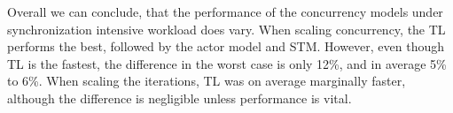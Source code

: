 %
Overall we can conclude, that the performance of the concurrency models under synchronization intensive workload does vary. When scaling concurrency, the \ac{TL} performs the best, followed by the actor model and \ac{STM}. However, even though \ac{TL} is the fastest, the difference in the worst case is only 12\%, and in average 5\% to 6\%. When scaling the iterations, \ac{TL} was on average marginally faster, although the difference is negligible unless performance is vital.
%


\worksheetend
